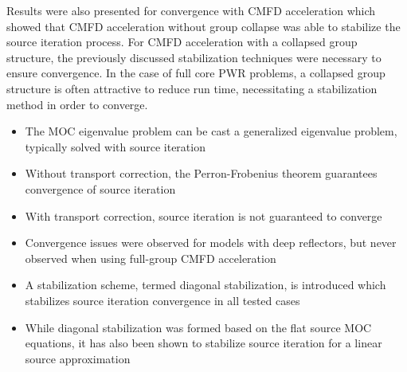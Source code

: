Results were also presented for convergence with \ac{CMFD} acceleration which showed that \ac{CMFD} acceleration without group collapse was able to stabilize the source iteration process. For \ac{CMFD} acceleration with a collapsed group structure, the previously discussed stabilization techniques were necessary to ensure convergence. In the case of full core \ac{PWR} problems, a collapsed group structure is often attractive to reduce run time, necessitating a stabilization method in order to converge.


\vfill
\begin{highlightsbox}[frametitle=Highlights]
	\begin{itemize}
		
		\item The \ac{MOC} eigenvalue problem can be cast a generalized eigenvalue problem, typically solved with source iteration
		
		\item Without transport correction, the Perron-Frobenius theorem guarantees convergence of source iteration
		
		\item With transport correction, source iteration is not guaranteed to converge
		
		\item Convergence issues were observed for models with deep reflectors, but never observed when using full-group \ac{CMFD} acceleration
		
		\item A stabilization scheme, termed diagonal stabilization, is introduced which stabilizes source iteration convergence in all tested cases
		
		\item While diagonal stabilization was formed based on the flat source \ac{MOC} equations, it has also been shown to stabilize source iteration for a linear source approximation
		
		
	\end{itemize}
\end{highlightsbox}
\vfill